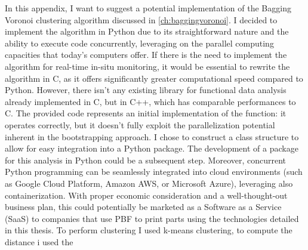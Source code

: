 

\lstset{style=mystyle}

In this appendix, I want to suggest a potential implementation of the Bagging Voronoi clustering algorithm discussed in \ref{ch:baggingvoronoi}. I decided to implement the algorithm in Python due to its straightforward nature and the ability to execute code concurrently, leveraging on the parallel computing capacities that today's computers offer. If there is the need to implement the algorithm for real-time in-situ monitoring, it would be essential to rewrite the algorithm in C, as it offers significantly greater computational speed compared to Python. However, there isn't any existing library for functional data analysis already implemented in C, but in C++, which has comparable performances to C. The provided code represents an initial implementation of the function: it operates correctly, but it doesn't fully exploit the parallelization potential inherent in the bootstrapping approach. I chose to construct a class structure to allow for easy integration into a Python package. The development of a package for this analysis in Python could be a subsequent step. Moreover, concurrent Python programming can be seamlessly integrated into cloud environments (such as Google Cloud Platform, Amazon AWS, or Microsoft Azure), leveraging also containerization. With proper economic consideration and a well-thought-out business plan, this could potentially be marketed as a Software as a Service (SaaS) to companies that use PBF to print parts using the technologies detailed in this thesis. To perform clustering I used k-means clustering, to compute the distance i used the 
\\ [0.2in]
